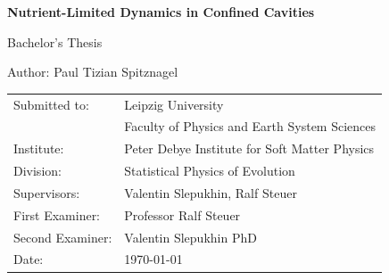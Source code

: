 \documentclass[11pt,a4paper]{report}
\begin{document}
		\begin{titlepage}
			\centering
			
			\vspace*{2cm}
			
			{\LARGE\bfseries Nutrient-Limited Dynamics in Confined Cavities\par}
			
			\vspace{1.5cm}
			
			{\Large Bachelor's Thesis\par}
			
			\vfill
			
			{\large
				Author: Paul Tizian Spitznagel
			}
			
			\vspace{2cm}
			
			\begin{flushleft}
				\begin{tabular}{@{}ll}
					Submitted to:     & Leipzig University \\
					& Faculty of Physics and Earth System Sciences \\
					Institute:        & Peter Debye Institute for Soft Matter Physics \\
					Division:         & Statistical Physics of Evolution  \\
					Supervisors:    & Valentin Slepukhin, Ralf Steuer \\
					First Examiner:   & Professor Ralf Steuer \\
					Second Examiner:  & Valentin Slepukhin PhD \\
					Date:             & \today
				\end{tabular}
			\end{flushleft}
			
			\vfill

		
	\end{titlepage}
\end{document}
